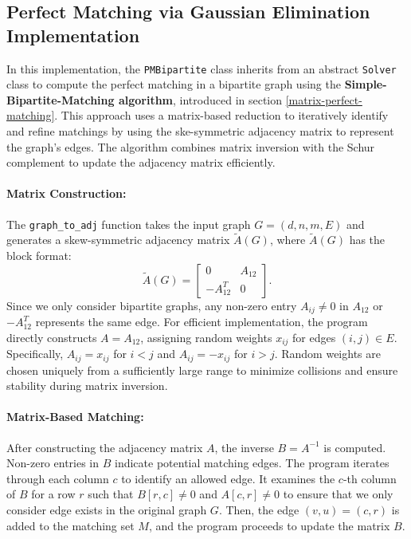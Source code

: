 \subsection{Perfect Matching via Gaussian Elimination Implementation} \label{pmReduction}

In this implementation, the \texttt{PMBipartite} class inherits from an abstract \texttt{Solver} class to compute the perfect matching in a bipartite graph using the \textbf{Simple-Bipartite-Matching algorithm}, introduced in section \ref{matrix-perfect-matching}. This approach uses a matrix-based reduction to iteratively identify and refine matchings by using the ske-symmetric adjacency matrix to represent the graph's edges. The algorithm combines matrix inversion with the Schur complement to update the adjacency matrix efficiently. 

\paragraph{Matrix Construction:}
The \texttt{graph\_to\_adj} function takes the input graph \( G = (d, n, m, E) \) and generates a skew-symmetric adjacency matrix \( \tilde{A}(G) \), where \( \tilde{A}(G) \) has the block format:
\[
\tilde{A}(G) =
\begin{bmatrix}
0 & A_{12} \\
-A_{12}^T & 0
\end{bmatrix}.
\]
Since we only consider bipartite graphs, any non-zero entry \( A_{ij} \neq 0 \) in \( A_{12} \) or \( -A_{12}^T \) represents the same edge. For efficient implementation, the program directly constructs \( A = A_{12} \), assigning random weights \( x_{ij} \) for edges \( (i, j) \in E \). Specifically, \( A_{ij} = x_{ij} \) for \( i < j \) and \( A_{ij} = -x_{ij} \) for \( i > j \). Random weights are chosen uniquely from a sufficiently large range to minimize collisions and ensure stability during matrix inversion.

\paragraph{Matrix-Based Matching:}
After constructing the adjacency matrix \( A \), the inverse \( B = A^{-1} \) is computed. Non-zero entries in \( B \) indicate potential matching edges. The program iterates through each column \( c \) to identify an allowed edge. It examines the \( c \)-th column of \( B \) for a row \( r \) such that \( B[r, c] \neq 0 \) and  \( A[c, r] \neq 0 \) to ensure that we only consider edge exists in the original graph \( G \). Then, the edge \( (v, u) = (c, r) \) is added to the matching set \( M \), and the program proceeds to update the matrix \( B \).

